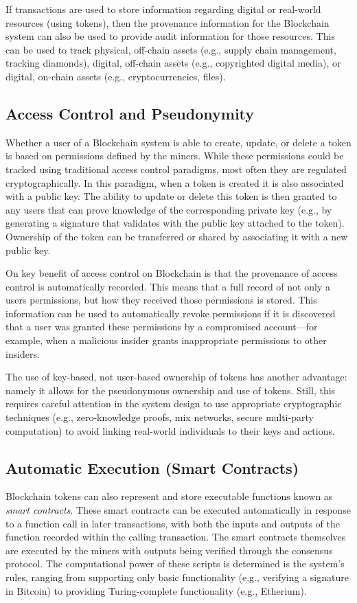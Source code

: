 If transactions are used to store information regarding digital or real-world resources (using tokens), then the provenance information for the Blockchain system can also be used to provide audit information for those resources.
This can be used to track physical, off-chain assets (e.g., supply chain management, tracking diamonds), digital, off-chain assets (e.g., copyrighted digital media), or digital, on-chain assets (e.g., cryptocurrencies, files).
 
\subsection{Access Control and Pseudonymity}
Whether a user of a Blockchain system is able to create, update, or delete a token is based on permissions defined by the miners.
While these permissions could be tracked using traditional access control paradigms, most often they are regulated cryptographically.
In this paradigm, when a token is created it is also associated with a public key.
The ability to update or delete this token is then granted to any users that can prove knowledge of the corresponding private key (e.g., by generating a signature that validates with the public key attached to the token).
Ownership of the token can be transferred or shared by associating it with a new public key.

On key benefit of access control on Blockchain is that the provenance of access control is automatically recorded.
This means that a full record of not only a users permissions, but how they received those permissions is stored.
This information can be used to automatically revoke permissions if it is discovered that a user was granted these permissions by a compromised account---for example, when a malicious insider grants inappropriate permissions to other insiders.

The use of key-based, not user-based ownership of tokens has another advantage: namely it allows for the pseudonymous ownership and use of tokens.
Still, this requires careful attention in the system design to use appropriate cryptographic techniques (e.g., zero-knowledge proofs, mix networks, secure multi-party computation) to avoid linking real-world individuals to their keys and actions.

\subsection{Automatic Execution (Smart Contracts)}
Blockchain tokens can also represent and store executable functions known as \emph{smart contracts}.
These smart contracts can be executed automatically in response to a function call in later transactions, with both the inputs and outputs of the function recorded within the calling transaction.
The smart contracts themselves are executed by the miners with outputs being verified through the consensus protocol.
The computational power of these scripts is determined is the system's rules, ranging from supporting only basic functionality (e.g., verifying a signature in Bitcoin) to providing Turing-complete functionality (e.g., Etherium).

